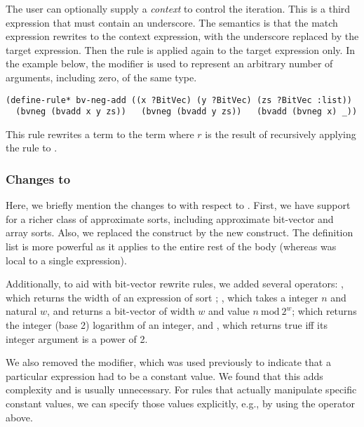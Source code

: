 The user can optionally supply a \emph{context} to control the iteration.  This
is a third expression that must contain an underscore.  
The semantics is that the match expression rewrites to the context expression, with
the underscore replaced by the target expression.  Then the rule is applied
again to the target expression only. 
In the example below,
the  modifier is used to represent an arbitrary number
of arguments, including zero, of the same type.  

\begin{lstlisting}[language=rare]
(define-rule* bv-neg-add ((x ?BitVec) (y ?BitVec) (zs ?BitVec :list))
  (bvneg (bvadd x y zs))   (bvneg (bvadd y zs))   (bvadd (bvneg x) _))
\end{lstlisting}
%
This rule rewrites a term 
to the term  
where $r$ is the result of recursively applying the rule 
to .

\subsubsection{Changes to \dsl}
Here, we briefly mention the changes to \dsl with respect
to \cite{notzli2022reconstructing}.  First, we have support for a richer class
of approximate sorts, including approximate bit-vector and array sorts.  Also, we
replaced the  construct by the new  construct.
The definition list is more powerful as it applies to the entire rest of the
body (whereas  was local to a single expression).

Additionally, to aid with bit-vector rewrite rules, we added several operators:
, which returns the width of an expression of sort
; , which takes a integer $n$ and natural $w$, 
and returns a bit-vector of width $w$ and value $n\ \mathrm{mod}\ 2^w$;
 which returns the integer (base 2) logarithm of an integer,
and , which returns true iff its integer argument is a power of 2.

We also removed the  modifier, which was used
previously to indicate that a particular expression had to be a constant
value.  We found that this adds complexity and is usually unnecessary.  For rules that actually manipulate specific constant values,
we can specify those values explicitly, e.g., by using
the  operator above.

